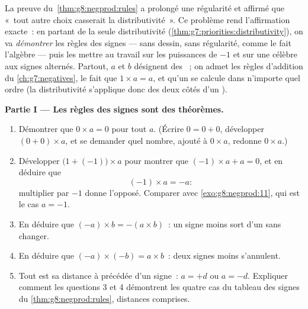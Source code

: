 \begin{problem}
\label{pb:g8:negprod:1}
La preuve du~\cref{thm:g8:negprod:rules} a prolongé une régularité et
affirmé que «~tout autre choix casserait la distributivité~». Ce
problème rend l'affirmation exacte~: en partant de la seule
distributivité (\cref{thm:g7:priorities:distributivity}), on va
\emph{démontrer} les règles des signes --- sans dessin, sans
régularité, comme le fait l'algèbre --- puis les mettre au travail
sur les puissances de $-1$ et sur une  célèbre aux signes
alternés. Partout, $a$ et $b$ désignent des ~; on
admet les règles d'addition du \cref{ch:g7:negatives}, le fait que
$1 \times a = a$, et qu'un  se calcule dans n'importe quel
ordre (la distributivité s'applique donc des deux côtés d'un
).

\medskip
\noindent\textbf{Partie I --- Les règles des signes sont des
théorèmes.}
\begin{enumerate}
  \item Démontrer que $0 \times a = 0$ pour tout  $a$.
        (Écrire $0 = 0 + 0$, développer $(0 + 0) \times a$, et se
        demander quel nombre, ajouté à $0 \times a$, redonne
        $0 \times a$.)
  \item Développer $\bigl(1 + (-1)\bigr) \times a$ pour montrer que
        $(-1) \times a + a = 0$, et en déduire que
        \[
        (-1) \times a = -a :
        \]
        multiplier par $-1$ donne l'opposé. Comparer avec
        \cref{exo:g8:negprod:11}, qui est le cas $a = -1$.
  \item En déduire que $(-a) \times b = -(a \times b)$~: un signe
        moins sort d'un  sans changer.
  \item En déduire que $(-a) \times (-b) = a \times b$~: deux signes
        moins s'annulent.
  \item Tout  est sa distance à  précédée d'un
        signe~: $a = +d$ ou $a = -d$. Expliquer comment les questions
        3 et 4 démontrent les quatre cas du tableau des signes du
        \cref{thm:g8:negprod:rules}, distances comprises.
\end{enumerate}


\end{problem}
